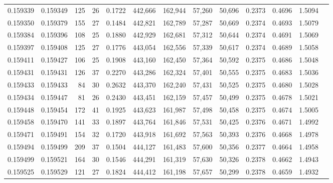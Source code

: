 \begin{tabular}{rrrrrrrrrrrrr}
0.159339 & 0.159349 &   125 &  26 &                                     0.1722 & 442,666 & 162,944 &  57,260 &  50,696 & 0.2373 & 0.4696 & 1.5094 \\
0.159350 & 0.159379 &   155 &  27 &                                     0.1484 & 442,821 & 162,789 &  57,287 &  50,669 & 0.2374 & 0.4693 & 1.5079 \\
0.159384 & 0.159396 &   108 &  25 &                                     0.1880 & 442,929 & 162,681 &  57,312 &  50,644 & 0.2374 & 0.4691 & 1.5069 \\
0.159397 & 0.159408 &   125 &  27 &                                     0.1776 & 443,054 & 162,556 &  57,339 &  50,617 & 0.2374 & 0.4689 & 1.5058 \\
0.159411 & 0.159427 &   106 &  25 &                                     0.1908 & 443,160 & 162,450 &  57,364 &  50,592 & 0.2375 & 0.4686 & 1.5048 \\
0.159431 & 0.159431 &   126 &  37 &                                     0.2270 & 443,286 & 162,324 &  57,401 &  50,555 & 0.2375 & 0.4683 & 1.5036 \\
0.159433 & 0.159433 &    84 &  30 &                                     0.2632 & 443,370 & 162,240 &  57,431 &  50,525 & 0.2375 & 0.4680 & 1.5028 \\
0.159434 & 0.159447 &    81 &  26 &                                     0.2430 & 443,451 & 162,159 &  57,457 &  50,499 & 0.2375 & 0.4678 & 1.5021 \\
0.159448 & 0.159454 &   172 &  41 &                                     0.1925 & 443,623 & 161,987 &  57,498 &  50,458 & 0.2375 & 0.4674 & 1.5005 \\
0.159458 & 0.159470 &   141 &  33 &                                     0.1897 & 443,764 & 161,846 &  57,531 &  50,425 & 0.2376 & 0.4671 & 1.4992 \\
0.159471 & 0.159491 &   154 &  32 &                                     0.1720 & 443,918 & 161,692 &  57,563 &  50,393 & 0.2376 & 0.4668 & 1.4978 \\
0.159494 & 0.159499 &   209 &  37 &                                     0.1504 & 444,127 & 161,483 &  57,600 &  50,356 & 0.2377 & 0.4664 & 1.4958 \\
0.159499 & 0.159521 &   164 &  30 &                                     0.1546 & 444,291 & 161,319 &  57,630 &  50,326 & 0.2378 & 0.4662 & 1.4943 \\
0.159525 & 0.159529 &   121 &  27 &                                     0.1824 & 444,412 & 161,198 &  57,657 &  50,299 & 0.2378 & 0.4659 & 1.4932 \\

\end{tabular}
